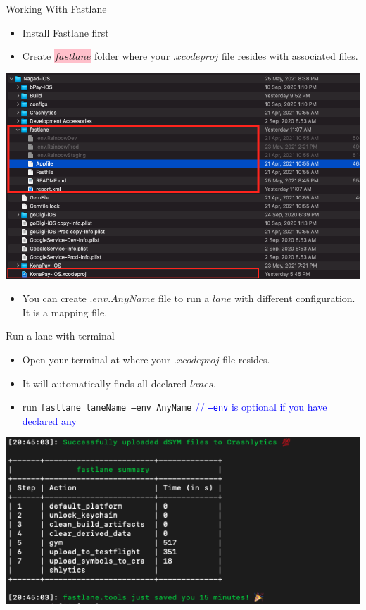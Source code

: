 \documentclass{beamer}
\newcommand{\code}[1]{\colorbox{light-gray}{\texttt{#1}}}
\begin{document}
\begin{frame}{Working With Fastlane}
    \begin{itemize}
        \item Install Fastlane first
        \item Create \colorbox{pink}{$fastlane$} folder where your $.xcodeproj$ file resides with associated files.
    \end{itemize}
    \includegraphics[scale=0.25]{fastlane_integration}\centering
    \begin{itemize}
        \item You can create $.env.AnyName$ file to run a $lane$ with different configuration. It is a mapping file.
    \end{itemize}
    
    
\end{frame}

\begin{frame}{Run a lane with terminal}
    \begin{itemize}
        \item Open your terminal at where your $.xcodeproj$ file resides.
        \item It will automatically finds all declared $lanes$.
        \item run \code{fastlane laneName --env AnyName} \textcolor{blue}{// \code{--env} is optional if you have declared any}
    \end{itemize}
    \includegraphics[scale=0.45]{fastlane_output.png}\centering
\end{frame}
\end{document}
